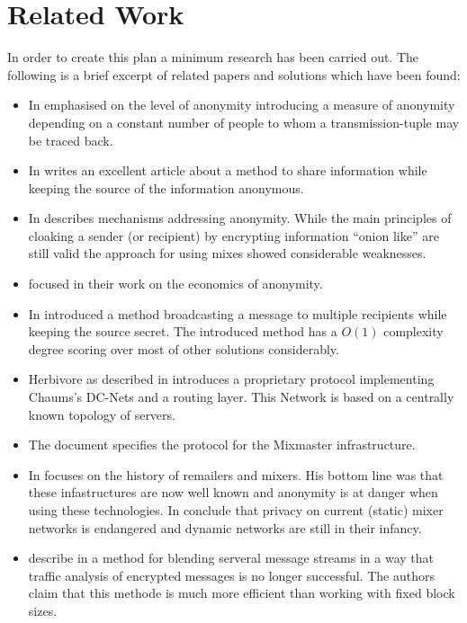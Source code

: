 \documentclass[twocolumn,a4paper,10pt,english]{scrartcl}
\begin{document}
\section{Related Work}
In order to create this plan a minimum research has been carried out. The following is a brief excerpt of related papers and solutions which have been found:
\begin{itemize}
\item In \cite{k-anonymous:ccs2003} \citeauthor{k-anonymous:ccs2003} emphasised on the level of anonymity introducing a measure of anonymity depending on a constant number of people to whom a transmission-tuple may be traced back.
\item In \citeyear{chaum-dc} \citeauthor{chaum-dc} writes an excellent article\cite{chaum-dc} about a method to share information while keeping the source of the information anonymous.
\item In \cite{chaum-mix} \citeauthor{chaum-mix} describes mechanisms addressing anonymity. While the main principles of cloaking a sender (or recipient) by encrypting information ``onion like'' are still valid the approach for using mixes showed considerable weaknesses.
\item \citeauthor{danezis:weis2006} focused in their work \cite{danezis:weis2006} on the economics of anonymity.
\item In \cite{xor-trees} \citeauthor{xor-trees} introduced a method broadcasting a message to multiple recipients while keeping the source secret. The introduced method has a $O(1)$ complexity degree scoring over most of other solutions considerably.
\item Herbivore as described in \cite{herbivore:tr} introduces a proprietary protocol implementing Chaums's DC-Nets and a routing layer. This Network is based on a centrally known topology of servers.
\item The document \cite{mixmaster-spec} specifies the protocol for the Mixmaster infrastructure.
\item In \cite{remailer-history} \citeauthor{remailer-history} focuses on the history of remailers and mixers. His bottom line was that these infastructures are now well known and anonymity is at danger when using these technologies. In \cite{RP03-1} \citeauthor{RP03-1} conclude that privacy on current (static) mixer networks is endangered and dynamic networks are still in their infancy.
\item \citeauthor{morphmix:wpes2002} describe in \cite{morphmix:wpes2002} a method for blending serveral message streams in a way that traffic analysis of encrypted messages is no longer successful. The authors claim that this methode is much more efficient than working with fixed block sizes.

\end{itemize}
\end{document}
